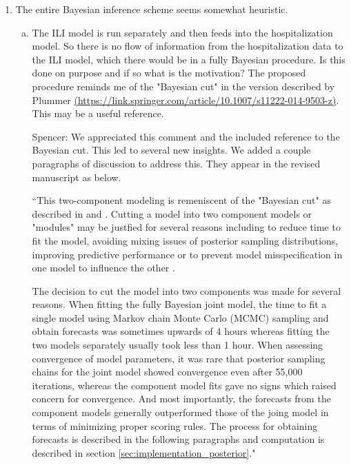 \documentclass{article}
\newcommand{\spencer}[1]{{\color{blue} Spencer: #1}}
\begin{document}
\begin{enumerate}[1.]
\item The entire Bayesian inference scheme seems somewhat heuristic.

\begin{enumerate}[a.]
\item The ILI model is run separately and then feeds into the hospitalization model. So there is no
flow of information from the hospitalization data to the ILI model, which there would be in a fully
Bayesian procedure. Is this done on purpose and if so what is the motivation? The proposed
procedure reminds me of the "Bayesian cut" in the version described by Plummer
\href{(https://link.springer.com/article/10.1007/s11222-014-9503-z)}{(https://link.springer.com/article/10.1007/s11222-014-9503-z)}.
This may be a useful reference.

\spencer{We appreciated this comment and the included reference to the Bayesian
cut. This led to several new insights. 
We added a couple paragraphs of discussion to address this. They appear in
the revised manuscript as below.

``This two-component modeling is remeniscent of the "Bayesian cut" as 
described in \cite{plummer2015cuts} and \cite{nott2023bayesian}. Cutting a model
into two component models or "modules" may be justfied for several reasons
including to reduce time to fit the model, avoiding mixing issues of posterior
sampling distributions, improving predictive performance or to prevent
model misspecification in one model to influence the other 
\cite[]{nott2023bayesian, jacob2020unbiased, jacob2017better, plummer2015cuts}.

The decision to cut the model into two components was made for several reasons.
When fitting the fully Bayesian joint model, the time to fit a single model using
Markov chain Monte Carlo (MCMC) sampling and
obtain forecasts was sometimes upwards of 4 hours whereas fitting the two models
separately usually took less than 1 hour. When assessing convergence of model
parameters, it was rare that posterior sampling chains for the joint model
showed convergence even after 55,000 iterations, whereas the component model 
fits gave no signs which raised concern for convergence. And most importantly,
the forecasts from the component models generally outperformed those of the 
joing model in terms of minimizing proper scoring rules. 
The process for obtaining forecasts is described in the following paragraphs 
and computation is described in section \ref{sec:implementation_posterior}."}


\end{enumerate}
\end{enumerate}
\end{document}
